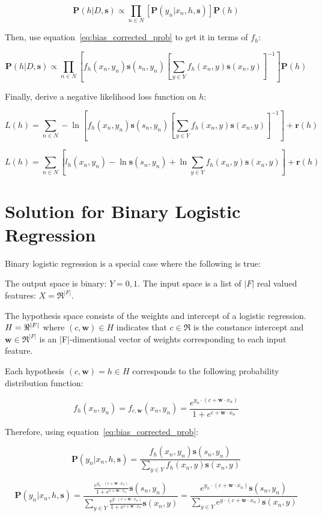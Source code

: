 \documentclass[twoside]{article}
\begin{document}
\[\mathbf{P}(h|D,\mathbf{s})\propto\prod_{n \in N} \left[\mathbf{P}(y_n|x_n,h,\mathbf{s})\right]\mathbf{P}(h)\]

Then, use equation~\eqref{eq:bias_corrected_prob} to get it in terms of \(f_h\):

\[\mathbf{P}(h|D,\mathbf{s})\propto\prod_{n \in N} \left[f_h(x_n,y_n)\mathbf{s}(s_n,y_n)\left [\sum_{y \in Y}f_h(x_n,y)\mathbf{s}(x_n,y) \right ]^{-1} \right]\mathbf{P}(h)\]

Finally, derive a negative likelihood loss function on \(h\):

\[L(h)= \sum_{n \in N} -\ln\left[f_h(x_n,y_n)\mathbf{s}(s_n,y_n)\left [\sum_{y \in Y}f_h(x_n,y)\mathbf{s}(x_n,y) \right ]^{-1} \right] +\mathbf{r}(h)\]

\[L(h)= \sum_{n \in N} \left[l_h(x_n,y_n)-\ln\mathbf{s}(s_n,y_n)+\ln\sum_{y \in Y}f_h(x_n,y)\mathbf{s}(x_n,y) \right] +\mathbf{r}(h)\]

\section{Solution for Binary Logistic Regression}

Binary logistic regression is a special case where the following is true:

The output space is binary: \(Y = {0, 1}\).
The input space is a list of \(|F|\) real valued features: \(X = \Re ^{|F|}\).

The hypothesis space consists of the weights and intercept of a logistic regression. \(H=\Re \time \Re ^{|F|}\)  where  \((c, \mathbf{w}) \in H\) indicates that \(c \in \Re\) is the constance intercept and \(\mathbf{w} \in \Re ^{|F|}\) is an |F|-dimentional vector of weights corresponding to each input feature.

Each hypothesis \((c, \mathbf{w})=h \in H\) corresponds to the following probability distribution function:

\[f_h(x_n, y_n)=f_{c,\mathbf{w}}(x_n, y_n)=\frac{e^{y_n \cdot (c+\mathbf{w} \cdot x_n)}}{1+e^{c+\mathbf{w} \cdot x_n}}\]

Therefore, using  equation~\eqref{eq:bias_corrected_prob}:

\[\mathbf{P}(y_n|x_n,h,\mathbf{s})=\frac{f_h(x_n,y_n)\mathbf{s}(s_n,y_n)}{\sum_{y \in Y}f_h(x_n,y)\mathbf{s}(x_n,y)} \]

\[\mathbf{P}(y_n|x_n,h,\mathbf{s})=\frac{\frac{e^{y_n \cdot(c+\mathbf{w} \cdot x_n)}}{1+e^{c+\mathbf{w} \cdot x_n}}\mathbf{s}(s_n,y_n)}{\sum_{y \in Y}\frac{e^{y \cdot (c+\mathbf{w} \cdot x_n)}}{1+e^{c+\mathbf{w} \cdot x_n}}\mathbf{s}(x_n,y)} =\frac{e^{y_n \cdot (c+\mathbf{w} \cdot x_n)}\mathbf{s}(s_n,y_n)}{\sum_{y \in Y}e^{y \cdot (c+\mathbf{w} \cdot x_n)}\mathbf{s}(x_n,y)}\]
\end{document}
